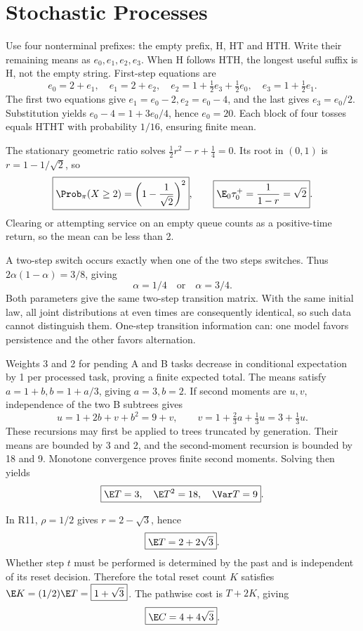 \section{Stochastic Processes}

Use four nonterminal prefixes: the empty prefix, H, HT and HTH. Write their remaining means as $e_0,e_1,e_2,e_3$. When H follows HTH, the longest useful suffix is H, not the empty string. First-step equations are
\[
 e_0=2+e_1,\quad e_1=2+e_2,\quad
 e_2=1+\tfrac12e_3+\tfrac12e_0,\quad
 e_3=1+\tfrac12e_1.
\]
The first two equations give $e_1=e_0-2,e_2=e_0-4$, and the last gives $e_3=e_0/2$. Substitution yields $e_0-4=1+3e_0/4$, hence $\boxed{e_0=20}$. Each block of four tosses equals HTHT with probability $1/16$, ensuring finite mean.

The stationary geometric ratio solves $\tfrac12r^2-r+\tfrac14=0$. Its root in $(0,1)$ is $r=1-1/\sqrt2$, so
\[
 \boxed{\Prob_\pi(X\ge2)=\left(1-\frac1{\sqrt2}\right)^2},\qquad
 \boxed{\E_0\tau_0^+=\frac1{1-r}=\sqrt2}.
\]
Clearing or attempting service on an empty queue counts as a positive-time return, so the mean can be less than 2.

A two-step switch occurs exactly when one of the two steps switches. Thus $2\alpha(1-\alpha)=3/8$, giving
\[
 \boxed{\alpha=1/4\quad\text{or}\quad\alpha=3/4}.
\]
Both parameters give the same two-step transition matrix. With the same initial law, all joint distributions at even times are consequently identical, so such data cannot distinguish them. One-step transition information can: one model favors persistence and the other favors alternation.

Weights 3 and 2 for pending A and B tasks decrease in conditional expectation by 1 per processed task, proving a finite expected total. The means satisfy $a=1+b,b=1+a/3$, giving $a=3,b=2$. If second moments are $u,v$, independence of the two B subtrees gives
\[
 u=1+2b+v+b^2=9+v,\qquad
 v=1+\tfrac23a+\tfrac13u=3+\tfrac13u.
\]
These recursions may first be applied to trees truncated by generation. Their means are bounded by 3 and 2, and the second-moment recursion is bounded by 18 and 9. Monotone convergence proves finite second moments. Solving then yields
\[
 \boxed{\E T=3,\quad\E T^2=18,\quad\Var T=9}.
\]

In R11, $\rho=1/2$ gives $r=2-\sqrt3$, hence
\[
 \boxed{\E T=2+2\sqrt3}.
\]
Whether step $t$ must be performed is determined by the past and is independent of its reset decision. Therefore the total reset count $K$ satisfies $\E K=(1/2)\E T=\boxed{1+\sqrt3}$. The pathwise cost is $T+2K$, giving
\[
 \boxed{\E C=4+4\sqrt3}.
\]

